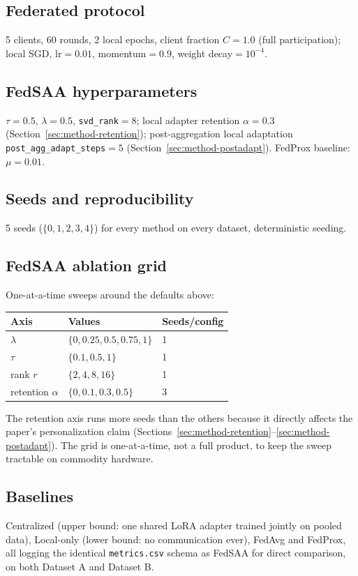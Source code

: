 \documentclass[11pt]{article}
\begin{document}
\subsection{Federated protocol}
5 clients, 60 rounds, 2 local epochs, client fraction $C{=}1.0$ (full participation); local SGD,
lr$=0.01$, momentum$=0.9$, weight decay$=10^{-4}$.

\subsection{FedSAA hyperparameters}
$\tau=0.5$, $\lambda=0.5$, \texttt{svd\_rank}$=8$; local adapter retention $\alpha=0.3$
(Section~\ref{sec:method-retention}); post-aggregation local adaptation
\texttt{post\_agg\_adapt\_steps}$=5$ (Section~\ref{sec:method-postadapt}). FedProx baseline:
$\mu=0.01$.

\subsection{Seeds and reproducibility}
5 seeds ($\{0,1,2,3,4\}$) for every method on every dataset, deterministic seeding.

\subsection{FedSAA ablation grid}
One-at-a-time sweeps around the defaults above:

\begin{table}[h]
\centering
\begin{tabular}{lll}
\toprule
Axis & Values & Seeds/config \\
\midrule
$\lambda$ & $\{0, 0.25, 0.5, 0.75, 1\}$ & 1 \\
$\tau$ & $\{0.1, 0.5, 1\}$ & 1 \\
rank $r$ & $\{2, 4, 8, 16\}$ & 1 \\
retention $\alpha$ & $\{0, 0.1, 0.3, 0.5\}$ & 3 \\
\bottomrule
\end{tabular}
\end{table}

The retention axis runs more seeds than the others because it directly affects the paper's
personalization claim (Sections~\ref{sec:method-retention}--\ref{sec:method-postadapt}). The
grid is one-at-a-time, not a full product, to keep the sweep tractable on commodity hardware.

\subsection{Baselines}
Centralized (upper bound: one shared LoRA adapter trained jointly on pooled data), Local-only
(lower bound: no communication ever), FedAvg and FedProx, all logging the identical
\texttt{metrics.csv} schema as FedSAA for direct comparison, on both Dataset A and Dataset B.
\end{document}
